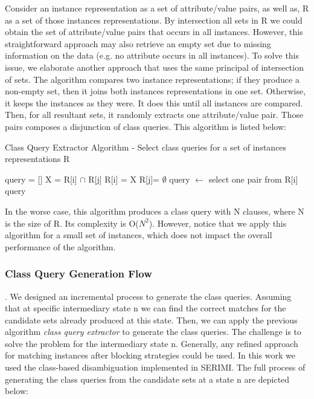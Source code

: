 Consider an instance representation as a set of attribute/value pairs, as well as, R as a set of those instances representations. By intersection all sets in R we could obtain the set of attribute/value pairs that occurs in all instances. However, this straightforward approach may also retrieve an empty set due to missing information on the data (e.g. no attribute occurs in all instances). To solve this issue, we elaborate another approach that uses the same principal of intersection of sets. The algorithm compares two instance representations; if they produce a non-empty set, then it joins both instances representations in one set. Otherwise, it keeps the instances as they were. It does this until all instances are compared. Then, for all resultant sets, it randomly extracts one attribute/value pair. Those pairs composes a disjunction of class queries. This algorithm is listed below:

\begin{algorithm}
\caption{Class Query Extractor Algorithm - Select class queries for a set of instances representations R}
\begin{algorithmic}
\STATE query = []
\STATE X = R[i] $\cap$ R[j]
\STATE  R[i] =  X
\STATE  R[j]= $\emptyset$
\ENDIF
\ENDFOR
\ENDFOR 
{}
\STATE query $\leftarrow$ select one pair from R[i]
\ENDFOR
\RETURN query
\end{algorithmic}
\end{algorithm}

In the worse case, this algorithm produces a class query with N clauses, where N is the size of R.  Its complexity is O($N^2$). However, notice that we apply this algorithm for a small set of instances, which does not impact the overall performance of the algorithm.

\subsubsection{Class Query Generation Flow}. We designed an incremental process to generate the class queries. Assuming that at specific intermediary state n we can find the correct matches for the candidate sets already produced at this state. Then, we can apply the previous algorithm \textit{class query extractor} to generate the class queries. The challenge is to solve the problem for the intermediary state n.  Generally, any refined approach for matching instances after blocking strategies could be used. In this work we used the class-based disambiguation implemented in SERIMI. The full process of generating the class queries from the candidate sets at a state n are depicted below:

